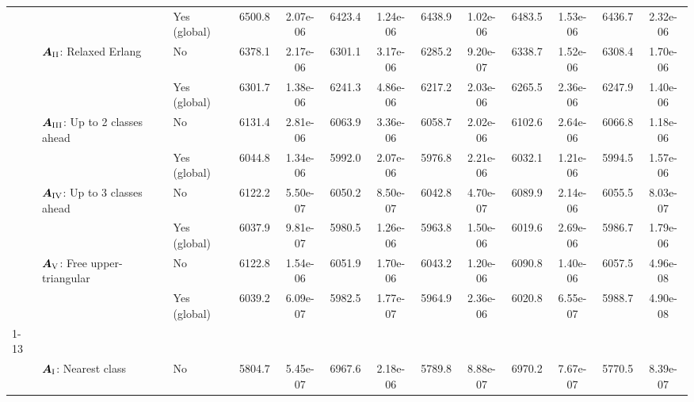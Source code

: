 \begin{threeparttable}
\begin{tabular}[t]{>{}lllcccccccccc}
\hspace{1em} &  & Yes (global) & 6500.8 & 2.07e-06 & 6423.4 & 1.24e-06 & 6438.9 & 1.02e-06 & 6483.5 & 1.53e-06 & 6436.7 & 2.32e-06\\

\addlinespace[0.5em]

\hspace{1em} & $\bm{A}_{\RN{2}}$: Relaxed Erlang & No & 6378.1 & 2.17e-06 & 6301.1 & 3.17e-06 & 6285.2 & 9.20e-07 & 6338.7 & 1.52e-06 & 6308.4 & 1.70e-06\\

\hspace{1em} &  & Yes (global) & 6301.7 & 1.38e-06 & 6241.3 & 4.86e-06 & 6217.2 & 2.03e-06 & 6265.5 & 2.36e-06 & 6247.9 & 1.40e-06\\

\addlinespace[0.5em]

\hspace{1em} & $\bm{A}_{\RN{3}}$: Up to 2 classes ahead & No & 6131.4 & 2.81e-06 & 6063.9 & 3.36e-06 & 6058.7 & 2.02e-06 & 6102.6 & 2.64e-06 & 6066.8 & 1.18e-06\\

\hspace{1em} &  & Yes (global) & 6044.8 & 1.34e-06 & 5992.0 & 2.07e-06 & 5976.8 & 2.21e-06 & 6032.1 & 1.21e-06 & 5994.5 & 1.57e-06\\

\addlinespace[0.5em]

\hspace{1em} & $\bm{A}_{\RN{4}}$: Up to 3 classes ahead & No & 6122.2 & 5.50e-07 & 6050.2 & 8.50e-07 & 6042.8 & 4.70e-07 & 6089.9 & 2.14e-06 & 6055.5 & 8.03e-07\\

\hspace{1em} &  & Yes (global) & 6037.9 & 9.81e-07 & 5980.5 & 1.26e-06 & 5963.8 & 1.50e-06 & 6019.6 & 2.69e-06 & 5986.7 & 1.79e-06\\

\addlinespace[0.5em]

\hspace{1em} & $\bm{A}_{\RN{5}}$: Free upper-triangular & No & 6122.8 & 1.54e-06 & 6051.9 & 1.70e-06 & 6043.2 & 1.20e-06 & 6090.8 & 1.40e-06 & 6057.5 & 4.96e-08\\

\hspace{1em} &  & Yes (global) & 6039.2 & 6.09e-07 & 5982.5 & 1.77e-07 & 5964.9 & 2.36e-06 & 6020.8 & 6.55e-07 & 5988.7 & 4.90e-08\\
\cmidrule{1-13}
\addlinespace[0.3em]
\multicolumn{13}{l}{\textbf{\textbf{Mixture Markov jump process ($G=4$)}}}\\
\hspace{1em} & $\bm{A}_{\RN{1}}$: Nearest class & No & 5804.7 & 5.45e-07 & 6967.6 & 2.18e-06 & 5789.8 & 8.88e-07 & 6970.2 & 7.67e-07 & 5770.5 & 8.39e-07\\


\end{tabular}
\end{threeparttable}
